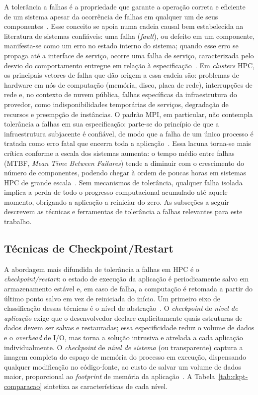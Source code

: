 A tolerância a falhas é a propriedade que garante a operação correta e eficiente de um
sistema apesar da ocorrência de falhas em qualquer um de seus
componentes~\cite{avizienis2004taxonomy}. Esse conceito se apoia numa cadeia causal bem
estabelecida na literatura de sistemas confiáveis: uma falha (\textit{fault}), ou
defeito em um componente, manifesta-se como um erro no estado interno
do sistema; quando esse erro se propaga até a interface de serviço, ocorre uma falha de
serviço, caracterizada pelo desvio do comportamento entregue em
relação à especificação~\cite{avizienis2004taxonomy}. Em \textit{clusters} HPC, os principais
vetores de falha que dão origem a essa cadeia são: problemas de hardware em nós de
computação (memória, disco, placa de rede), interrupções de rede e, no contexto de
nuvem pública, falhas específicas da infraestrutura do provedor, como indisponibilidades
temporárias de serviços, degradação de recursos e preempção de instâncias. O padrão
MPI, em particular, não contempla tolerância a falhas em sua especificação: parte-se do princípio de que a
infraestrutura subjacente é confiável, de modo que a falha de um único processo é
tratada como erro fatal que encerra toda a aplicação~\cite{camargo2017ftmpi}. Essa
lacuna torna-se mais crítica conforme a escala dos sistemas aumenta: o tempo médio
entre falhas (MTBF, \textit{Mean Time Between Failures}) tende a diminuir com o
crescimento do número de componentes, podendo chegar à ordem de poucas horas em
sistemas HPC de grande escala~\cite{moody2010scr,camargo2017ftmpi}. Sem mecanismos de
tolerância, qualquer falha isolada implica a perda de todo o progresso computacional
acumulado até aquele momento, obrigando a aplicação a reiniciar do zero. As subseções a
seguir descrevem as técnicas e ferramentas de tolerância a falhas relevantes para este
trabalho.

\subsection{Técnicas de Checkpoint/Restart}
\label{sec:checkpoint-restart}

A abordagem mais difundida de tolerância a falhas em HPC é o
\textit{checkpoint\slash restart}: o
estado de execução da aplicação é periodicamente salvo em armazenamento estável e, em
caso de falha, a computação é retomada a partir do último ponto salvo em vez de
reiniciada do início. Um primeiro eixo de classificação dessas técnicas é o nível de
abstração~\cite{posner2020syslevel}. O \textit{checkpoint} de \textit{nível de aplicação} exige
que o desenvolvedor declare explicitamente quais estruturas de dados devem ser salvas e
restauradas; essa especificidade reduz o volume de dados e o \textit{overhead} de I/O, mas torna
a solução intrusiva e atrelada a cada aplicação individualmente. O \textit{checkpoint} de
\textit{nível de sistema} (ou transparente) captura a imagem completa do espaço de
memória do processo em execução, dispensando qualquer modificação no código-fonte, ao
custo de salvar um volume de dados maior, proporcional ao \textit{footprint} de memória
da aplicação~\cite{posner2020syslevel}. A Tabela~\ref{tab:ckpt-comparacao} sintetiza as
características de cada nível.

